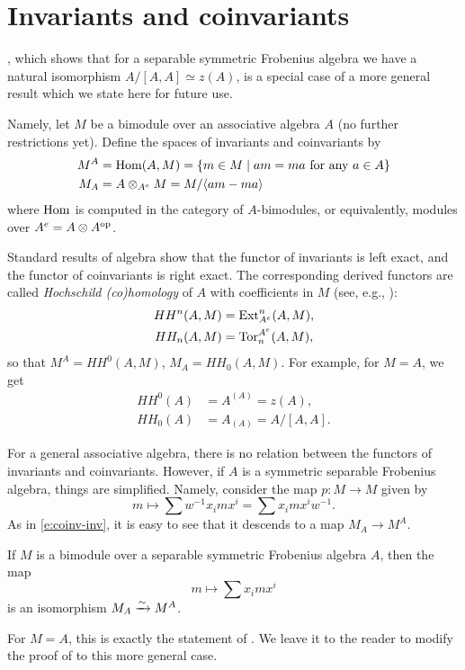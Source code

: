 \section{Invariants and coinvariants}\label{s:invariants}
, which shows that for a separable symmetric Frobenius
algebra we have a natural isomorphism $A/[A,A]\simeq z(A)$, is a special
case of a more general result which we state here for future use.

Namely, let $M$ be a bimodule over an associative algebra $A$ (no further
restrictions yet). Define the spaces of invariants and coinvariants by
\begin{equation}\label{e:coinv}
  \begin{aligned}
    M^{A}&=\operatorname{Hom}(A,M)=\{m\in M\; | \; am=ma \text{ for any } a\in A\}\\
    M_{A}&=A\otimes_{A^e} M = M/\langle am-ma\rangle
  \end{aligned}
\end{equation}
where $\operatorname{Hom}$ is computed in the category of $A$-bimodules, or
equivalently, modules over $A^e=A\otimes A^{\mathrm{op}}$.

Standard results of algebra show that the functor of invariants is left
exact, and the functor of coinvariants is right exact. The corresponding
derived functors are called \emph{Hochschild (co)homology} of $A$ with
coefficients in $M$ (see, e.g., \cite[Section 11.1]{pierce}):
\begin{align*}
  HH^n(A,M)&=\operatorname{Ext}_{A^e}^n(A,M),\\
  HH_n(A,M)&=\operatorname{Tor}^{A^e}_n(A,M),
\end{align*}
so that $M^{A}=HH^0(A,M)$, $M_{A}=HH_0(A,M)$.
For example, for $M=A$, we get
\begin{align*}
  HH^0(A)&=A^{(A)}=z(A),\\
  HH_0(A)&=A_{(A)}= A/[A,A].
\end{align*}

For a general associative algebra, there is no relation between the functors of
invariants and coinvariants. However, if $A$ is a symmetric separable Frobenius
algebra, things are simplified. Namely, consider the map $p\colon M\to M$ given
by
$$
  m\mapsto \sum w^{-1} x_imx^i=\sum x_imx^i w^{-1}.
$$
As in \eqref{e:coinv-inv}, it is easy to see that it descends to a map
$M_{A}\to M^{A}$.
\begin{lemma}\label{l:coinv-separable}
  If $M$ is a bimodule over a separable symmetric Frobenius algebra $A$, then
  the map
  $$
  m \mapsto \sum x_imx^i
  $$
  is an isomorphism $M_{A}\xrightarrow{\sim} M^{A}$.
  \end{lemma}
For $M=A$, this is exactly the statement of . We leave it
to the reader to modify the proof of  to this more general
case.


